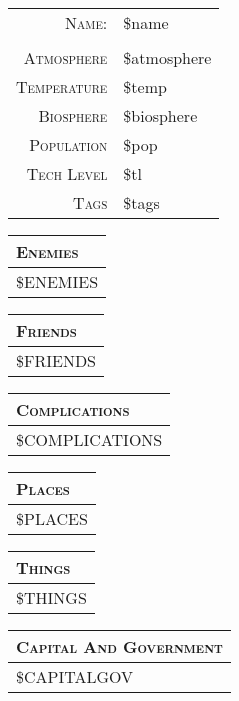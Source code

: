 \documentclass[12pt,letterpaper,twocolumn]{article}
\begin{document}
\begin{tabularx}{\linewidth}{ r | X |}
    \cline{2-2}
    \textsc{Name:} & \$name \\
    \cline{2-2}
    \multicolumn{2}{c}{} \\
    \cline{2-2}
    \textsc{Atmosphere} & \$atmosphere \\
    \cline{2-2}
    \textsc{Temperature} & \$temp \\
    \cline{2-2}
    \textsc{Biosphere} & \$biosphere \\
    \cline{2-2}
    \textsc{Population} & \$pop \\
    \cline{2-2}
    \textsc{Tech Level} & \$tl \\
    \cline{2-2}
    \textsc{Tags} & \$tags \\
    \cline{2-2}
\end{tabularx}

\begin{tabularx}{\linewidth}{| X |}
    \multicolumn{1}{l}{\textsc{Enemies}} \\
    \hline
    \$ENEMIES \\
    \hline
\end{tabularx}

\begin{tabularx}{\linewidth}{| X |}
    \multicolumn{1}{l}{\textsc{Friends}} \\
    \hline
    \$FRIENDS \\
    \hline
\end{tabularx}

\begin{tabularx}{\linewidth}{| X |}
    \multicolumn{1}{l}{\textsc{Complications}} \\
    \hline
    \$COMPLICATIONS \\
    \hline
\end{tabularx}

\begin{tabularx}{\linewidth}{| X |}
    \multicolumn{1}{l}{\textsc{Places}} \\
    \hline
    \$PLACES \\
    \hline
\end{tabularx}

\begin{tabularx}{\linewidth}{| X |}
    \multicolumn{1}{l}{\textsc{Things}} \\
    \hline
    \$THINGS \\
    \hline
\end{tabularx}

\begin{tabularx}{\linewidth}{| X |}
    \multicolumn{1}{l}{\textsc{Capital And Government}} \\
    \hline
    \$CAPITALGOV \\
    \hline
\end{tabularx}
\end{document}
